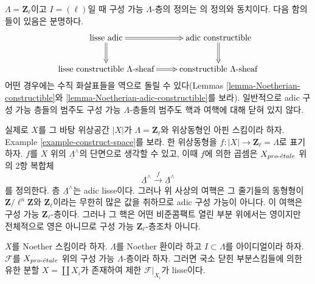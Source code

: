 \noindent
$\Lambda = \mathbf{Z}_\ell$이고 $I = (\ell)$일 때 구성 가능
$\Lambda$-층의 정의는 \cite[Expos\'e VI, Definition 1.1.1]{SGA5}의
정의와 동치이다. 다음 함의들이 있음은 분명하다.
$$
\xymatrix{
\text{lisse adic} \ar@{=>}[r] \ar@{=>}[d] &
\text{adic constructible} \ar@{=>}[d] \\
\text{lisse constructible }\Lambda\text{-sheaf} \ar@{=>}[r] &
\text{constructible }\Lambda\text{-sheaf}
}
$$
어떤 경우에는 수직 화살표들을 역으로 돌릴 수 있다(Lemmas
\ref{lemma-Noetherian-constructible}와
\ref{lemma-Noetherian-adic-constructible}를 보라). 일반적으로 adic
구성 가능 층들의 범주도 구성 가능 $\Lambda$-층들의 범주도 핵과
여핵에 대해 닫혀 있지 않다.

\medskip\noindent
실제로 $X$를 그 바탕 위상공간 $|X|$가
$\Lambda = \mathbf{Z}_\ell$와 위상동형인 아핀 스킴이라 하자. Example
\ref{example-construct-space}를 보라. 한 위상동형을
$f : |X| \to \mathbf{Z}_\ell = \Lambda$로 표기하자. $f$를 $X$ 위의
$\underline{\Lambda}^\wedge$의 단면으로 생각할 수 있고, 이때 $f$에
의한 곱셈은 $X_{pro\text{-}\acute{e}tale}$ 위의 2항 복합체
$$
\underline{\Lambda}^\wedge \xrightarrow{f} \underline{\Lambda}^\wedge
$$
를 정의한다. 층 $\underline{\Lambda}^\wedge$는 adic lisse이다. 그러나
위 사상의 여핵은 그 줄기들의 동형형이
$\mathbf{Z}/\ell^n\mathbf{Z}$와 $\mathbf{Z}_\ell$이라는 무한히 많은
값을 취하므로 adic 구성 가능이 아니다. 이 여핵은 구성 가능
$\mathbf{Z}_\ell$-층이다. 그러나 그 핵은
어떤 비준콤팩트 열린 부분 위에서는 영이지만 전체적으로 영은 아니므로
구성 가능 $\mathbf{Z}_\ell$-층조차 아니다.

\begin{lemma}
\label{lemma-Noetherian-constructible}
$X$를 Noether 스킴이라 하자. $\Lambda$를 Noether 환이라 하고
$I \subset \Lambda$를 아이디얼이라 하자. $\mathcal{F}$를
$X_{pro\text{-}\acute{e}tale}$ 위의 구성 가능 $\Lambda$-층이라 하자. 그러면 국소 닫힌
부분스킴들에 의한 유한 분할 $X = \coprod X_i$가 존재하여 제한
$\mathcal{F}|_{X_i}$가 lisse이다.
\end{lemma}

